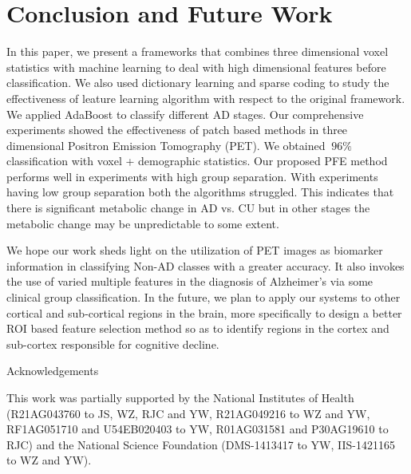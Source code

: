 \documentclass[authoryear,preprint,revi	ew,12pt]{elsarticle}
\begin{document}
\section{Conclusion and Future Work}
In this paper, we present a frameworks that combines three dimensional voxel statistics with machine learning to deal with high dimensional features before classification. We also used dictionary learning and sparse coding to study the effectiveness of leature learning algorithm with respect to the original framework. We applied AdaBoost to classify different AD stages. Our comprehensive experiments showed the effectiveness of patch based methods in three dimensional Positron Emission Tomography (PET). We obtained $ ~96 \% $ classification with voxel + demographic statistics.
Our proposed PFE method performs well in experiments with high group separation. With experiments having low group separation both the algorithms struggled. This indicates that there is significant metabolic change in AD vs. CU but in other stages the metabolic change may be unpredictable to some extent. 

We hope our work sheds light on the utilization of PET images as biomarker information in classifying Non-AD classes with a greater accuracy. It also invokes the use of varied multiple features in the diagnosis of Alzheimer's via some clinical group classification. In the future, we plan to apply our systems to other cortical and sub-cortical regions in the brain, more specifically to design a better ROI based feature selection method so as to identify regions in the cortex and sub-cortex responsible for cognitive decline.

\begin{center}
{\large Acknowledgements}
\end{center}

This work was partially supported by the National Institutes of Health (R21AG043760 to JS, WZ, RJC and YW, R21AG049216 to WZ and YW, RF1AG051710 and U54EB020403 to YW, R01AG031581 and P30AG19610 to RJC) and the National Science Foundation (DMS-1413417 to YW, IIS-1421165 to WZ and YW).
\end{document}
